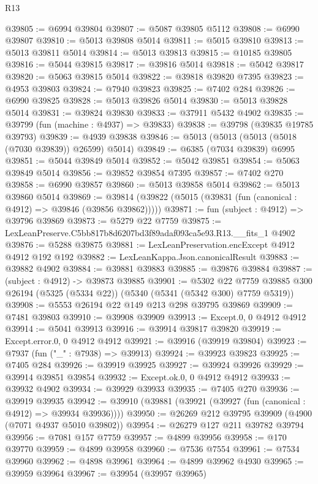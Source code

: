 \begin{lexlean}{R13}
\begin{coremodule}
@39805 := @6994 @39804
@39807 := @5087 @39805 @5112
@39808 := @6990 @39807
@39810 := @5013 @39808 @5014
@39811 := @5015 @39810
@39813 := @5013 @39811 @5014
@39814 := @5013 @39813
@39815 := @10185 @39805
@39816 := @5044 @39815
@39817 := @39816 @5014
@39818 := @5042 @39817
@39820 := @5063 @39815 @5014
@39822 := @39818 @39820 @7395
@39823 := @4953 @39803
@39824 := @7940 @39823
@39825 := @7402 @284
@39826 := @6990 @39825
@39828 := @5013 @39826 @5014
@39830 := @5013 @39828 @5014
@39831 := @39824 @39830
@39833 := @37911 @5432 @4902
@39835 := @39799 (fun (machine : @4937) => @39833)
@39838 := @39798 (@39835 @19785 @39793)
@39839 := @4939 @39838
@39846 := @5013 (@5013 (@5013 (@5018 (@7030 @39839)) @26599) @5014)
@39849 := @6385 (@7034 @39839) @6995
@39851 := @5044 @39849 @5014
@39852 := @5042 @39851
@39854 := @5063 @39849 @5014
@39856 := @39852 @39854 @7395
@39857 := @7402 @270
@39858 := @6990 @39857
@39860 := @5013 @39858 @5014
@39862 := @5013 @39860 @5014
@39869 := @39814 (@39822 (@5015 (@39831 (fun (canonical : @4912) => @39846 (@39856 @39862)))))
@39871 := fun (subject : @4912) => @39796 @39869
@39873 := @5279 @22 @7759
@39875 := LexLeanPreserve.C5bb817b8d6207bd3f89adaf093ca5e93.R13.__fits_1 @4902
@39876 := @5288 @39875
@39881 := LexLeanPreservation.encExcept @4912 @4912 @192 @192
@39882 := LexLeanKappa.Json.canonicalResult
@39883 := @39882 @4902
@39884 := @39881 @39883
@39885 := @39876 @39884
@39887 := (subject : @4912) -> @39873 @39885
@39901 := @5302
    @22
    @7759
    @39885
    @300
    @26194
    (@5325 (@5334 @22))
    (@5340 (@5341 (@5342 @300) @7759 @5319))
@39908 := @5553 @26194 @22 @149 @213 @298 @39795 @39869
@39909 := @7481 @39803
@39910 := @39908 @39909
@39913 := Except.{0, 0} @4912 @4912
@39914 := @5041 @39913
@39916 := @39914 @39817 @39820
@39919 := Except.error.{0, 0} @4912 @4912
@39921 := @39916 (@39919 @39804)
@39923 := @7937 (fun ("_" : @7938) => @39913)
@39924 := @39923 @39823
@39925 := @7405 @284
@39926 := @39919 @39925
@39927 := @39924 @39926
@39929 := @39914 @39851 @39854
@39932 := Except.ok.{0, 0} @4912 @4912
@39933 := @39932 @4902
@39934 := @39929 @39933
@39935 := @7405 @270
@39936 := @39919 @39935
@39942 := @39910 (@39881 (@39921 (@39927 (fun (canonical : @4912) => @39934 @39936))))
@39950 := @26269 @212 @39795 @39909 (@4900 (@7071 @4937 @5010 @39802))
@39954 := @26279 @127 @211 @39782 @39794
@39956 := @7081 @157 @7759
@39957 := @4899 @39956
@39958 := @170 @39770
@39959 := @4899 @39958
@39960 := @7536 @7554
@39961 := @7534 @39960
@39962 := @4898 @39961
@39964 := @4899 @39962 @4930
@39965 := @39959 @39964
@39967 := @39954 (@39957 @39965)

\end{coremodule}
\end{lexlean}
